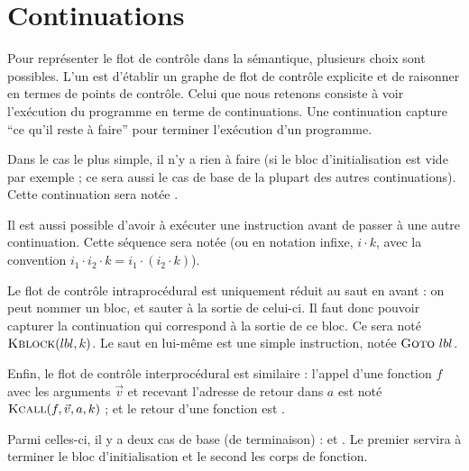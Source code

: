 \section{Continuations}
\label{sec:cont}

Pour représenter le flot de contrôle dans la sémantique, plusieurs choix sont
possibles. L'un est d'établir un graphe de flot de contrôle explicite et de
raisonner en termes de points de contrôle. Celui que nous retenons consiste à
voir l'exécution du programme en terme de continuations. Une continuation
capture ``ce qu'il reste à faire'' pour terminer l'exécution d'un programme.

Dans le cas le plus simple, il n'y a rien à faire (si le bloc d'initialisation
est vide par exemple ; ce sera aussi le cas de base de la plupart des autres
continuations). Cette continuation sera notée \kPass.

Il est aussi possible d'avoir à exécuter une instruction avant de passer à une
autre continuation. Cette séquence sera notée  (ou en notation
infixe, $i \cdot k$, avec la convention $i_1 \cdot i_2 \cdot k = i_1 \cdot (i_2
\cdot k) $).

Le flot de contrôle intraprocédural est uniquement réduit au saut en avant : on
peut nommer un bloc, et sauter à la sortie de celui-ci. Il faut donc pouvoir
capturer la continuation qui correspond à la sortie de ce bloc. Ce sera noté
$\textsc{Kblock}(lbl, k)$. Le saut en lui-même est une simple instruction, notée
$\textsc{Goto}~lbl$.

Enfin, le flot de contrôle interprocédural est similaire : l'appel d'une
fonction $f$ avec les arguments $\vec{v}$ et recevant l'adresse de retour dans
$a$ est noté $\textsc{Kcall}(f, \vec{v}, a, k)$ ; et le retour d'une fonction est
.


Parmi celles-ci, il y a deux cas de base (de terminaison) : \kPass et
\phx{\kRet}. Le premier servira à terminer le bloc d'initialisation et le
second les corps de fonction.

